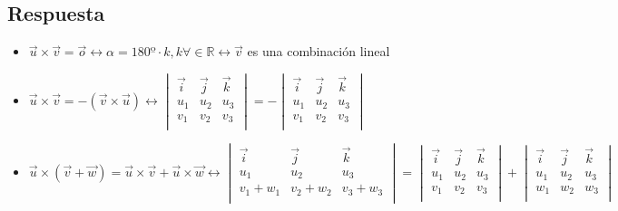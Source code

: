 \documentclass[
	12pt, %
	spanish, %
]{fphw}
\newcommand{\vv}{\vec{v}}
\begin{document}
\subsection*{Respuesta}
\begin{itemize}
	\item  $\vec{u} \times \vec{v} = \vec{o} \leftrightarrow \alpha = 180º \cdot k, k \forall \in \mathbb{R}\leftrightarrow \vv$ es una combinación lineal\\
	\item $\vec{u} \times \vec{v} = -(\vec{v} \times\vec{u}) \leftrightarrow
	 \begin{vmatrix}
		\vec{i} & \vec{j} & \vec{k} \\
		u_1 & u_2 & u_3\\
		v_1 & v_2 & v_3 \\
	\end{vmatrix} = - 
	\begin{vmatrix}
		\vec{i} & \vec{j} & \vec{k} \\
		u_1 & u_2 & u_3\\
		v_1 & v_2 & v_3 \\
	\end{vmatrix} $
	\item $\vec{u} \times (\vec{v} + \vec{w}) = \vec{u} \times \vec{v} + \vec{u} \times \vec{w} \leftrightarrow 
	 \begin{vmatrix}
		\vec{i} & \vec{j} & \vec{k} \\
		u_1 & u_2 & u_3\\
		v_1 + w_1 & v_2 + w_2 & v_3 +w_3 \\	\end{vmatrix} = 
	\begin{vmatrix}
		\vec{i} & \vec{j} & \vec{k} \\
		u_1 & u_2 & u_3\\
		v_1 & v_2 & v_3 \\
	\end{vmatrix} +
	\begin{vmatrix}
		\vec{i} & \vec{j} & \vec{k} \\
		u_1 & u_2 & u_3\\
		w_1 & w_2 & w_3 \\
	\end{vmatrix}$


\end{itemize}
\end{document}
